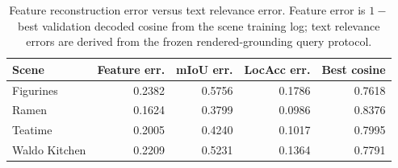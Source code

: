 \begin{table}[t]
\centering
\caption{Feature reconstruction error versus text relevance error. Feature error is $1-$ best validation decoded cosine from the scene training log; text relevance errors are derived from the frozen rendered-grounding query protocol.}
\label{tab:feature_error_text_relevance}
\begin{tabular}{lrrrr}
\toprule
Scene & Feature err. & mIoU err. & LocAcc err. & Best cosine \\
\midrule
Figurines & 0.2382 & 0.5756 & 0.1786 & 0.7618 \\
Ramen & 0.1624 & 0.3799 & 0.0986 & 0.8376 \\
Teatime & 0.2005 & 0.4240 & 0.1017 & 0.7995 \\
Waldo Kitchen & 0.2209 & 0.5231 & 0.1364 & 0.7791 \\
\bottomrule
\end{tabular}
\end{table}
